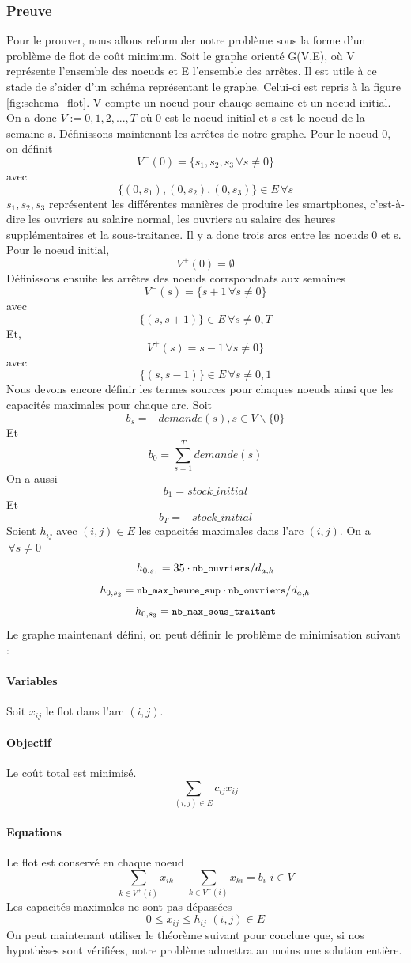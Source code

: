 \documentclass[12pt,oneside,a4paper]{article}
\newcommand{\texttts}[1]{{\small\texttt{#1}}}
\begin{document}
\subsubsection*{Preuve}
Pour le prouver, nous allons reformuler notre problème sous la forme d'un problème de flot de coût minimum.
Soit le graphe orienté G(V,E), où V représente l'ensemble des noeuds et E l'ensemble des arrêtes.
Il est utile à ce stade de s'aider d'un schéma représentant le graphe. 
Celui-ci est repris à la figure \ref{fig:schema_flot}.
V compte un noeud pour chauqe semaine et un noeud initial.
On a donc $V := {0, 1, 2, ..., T}$ où 0 est le noeud initial et s est le noeud de la semaine s.
Définissons maintenant les arrêtes de notre graphe.
Pour le noeud 0, on définit $$V^{-}(0) = \{s_1, s_2, s_3 \, \forall s \ne 0\}$$ avec $$\{(0, s_1), (0, s_2), (0, s_3)\} \in E \, \forall s$$
$s_1, s_2, s_3$ représentent les différentes manières de produire les smartphones, c'est-à-dire les ouvriers au salaire normal, les ouvriers au salaire des heures supplémentaires et la sous-traitance.
Il y a donc trois arcs entre les noeuds 0 et s.
Pour le noeud initial,  $$V^{+}(0) = \emptyset$$
Définissons ensuite les arrêtes des noeuds corrspondnats aux semaines \\
$$V^{-}(s) = \{s+1 \, \forall s \ne 0\}$$ avec $$\{(s, s+1)\} \in E \, \forall s \ne 0, T$$
Et, $$V^{+}(s) = s-1 \, \forall s \ne 0\}$$ avec $$\{(s, s-1)\} \in E \, \forall s \ne 0, 1$$
Nous devons encore définir les termes sources pour chaques noeuds ainsi que les capacités maximales pour chaque arc.
Soit $$b_s = - demande(s), s \in V \backslash \{0\}$$
Et $$b_0 = \sum_{s=1}^{T} demande(s)$$
On a aussi $$b_1 = stock\_initial$$
Et $$b_T = - stock\_initial$$
Soient $h_{ij}$ avec $(i, j) \in E$ les capacités maximales dans l'arc $(i, j)$.
On a $\, \forall s \ne 0$ 
$$h_{0, s_1} = 35\cdot \texttts{nb\_ouvriers}/ d_{a,h} $$
$$h_{0, s_2} = \texttts{nb\_max\_heure\_sup}\cdot\texttts{nb\_ouvriers}/ d_{a,h} $$
$$h_{0, s_3} = \texttts{nb\_max\_sous\_traitant} $$
Le graphe maintenant défini, on peut définir le problème de minimisation suivant :
\paragraph{Variables}
Soit $x_{ij}$ le flot dans l'arc $(i, j)$.
\paragraph{Objectif}
Le coût total est minimisé.
$$\sum_{(i, j) \in E} c_{ij} x_{ij}$$
\paragraph{Equations} Le flot est conservé en chaque noeud $$\sum_{k \in V^{+}(i)} x_{ik} - \sum_{k \in V^{-}(i)} x_{ki} = b_i \, \, i \in V$$
Les capacités maximales ne sont pas dépassées $$0 \leq x_{ij} \leq h_{ij} \, \, (i, j) \in E$$
On peut maintenant utiliser le théorème suivant pour conclure que, si nos hypothèses sont vérifiées, notre problème admettra au moins une solution entière.
\end{document}

